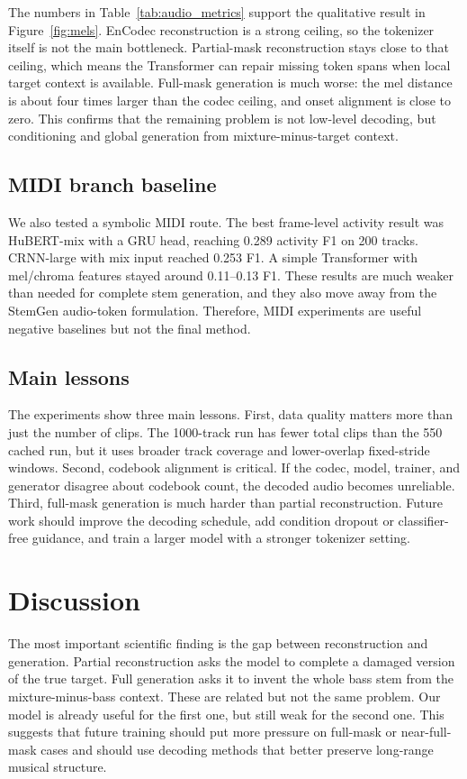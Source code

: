 \documentclass{article}
\begin{document}
The numbers in Table~\ref{tab:audio_metrics} support the qualitative result in Figure~\ref{fig:mels}. EnCodec reconstruction is a strong ceiling, so the tokenizer itself is not the main bottleneck. Partial-mask reconstruction stays close to that ceiling, which means the Transformer can repair missing token spans when local target context is available. Full-mask generation is much worse: the mel distance is about four times larger than the codec ceiling, and onset alignment is close to zero. This confirms that the remaining problem is not low-level decoding, but conditioning and global generation from mixture-minus-target context.

\subsection{MIDI branch baseline}

We also tested a symbolic MIDI route. The best frame-level activity result was HuBERT-mix with a GRU head, reaching 0.289 activity F1 on 200 tracks. CRNN-large with mix input reached 0.253 F1. A simple Transformer with mel/chroma features stayed around 0.11--0.13 F1. These results are much weaker than needed for complete stem generation, and they also move away from the StemGen audio-token formulation. Therefore, MIDI experiments are useful negative baselines but not the final method.

\subsection{Main lessons}

The experiments show three main lessons. First, data quality matters more than just the number of clips. The 1000-track run has fewer total clips than the 550 cached run, but it uses broader track coverage and lower-overlap fixed-stride windows. Second, codebook alignment is critical. If the codec, model, trainer, and generator disagree about codebook count, the decoded audio becomes unreliable. Third, full-mask generation is much harder than partial reconstruction. Future work should improve the decoding schedule, add condition dropout or classifier-free guidance, and train a larger model with a stronger tokenizer setting.

\section{Discussion}

The most important scientific finding is the gap between reconstruction and generation. Partial reconstruction asks the model to complete a damaged version of the true target. Full generation asks it to invent the whole bass stem from the mixture-minus-bass context. These are related but not the same problem. Our model is already useful for the first one, but still weak for the second one. This suggests that future training should put more pressure on full-mask or near-full-mask cases and should use decoding methods that better preserve long-range musical structure.
\end{document}

